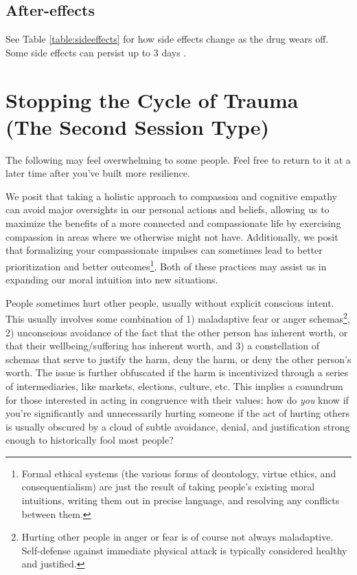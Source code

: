 \documentclass[12pt,letterpaper]{book}
\begin{document}
\subsection*{After-effects}
See Table \ref{table:sideeffects} for how side effects change as the drug wears off. Some side effects can persist up to 3 days \cite{liechtiGender}.
\section{Stopping the Cycle of Trauma (The Second Session Type)}
\label{stopcycle}
The following may feel overwhelming to some people. Feel free to return to it at a later time after you’ve built more resilience. 

We posit that taking a holistic approach to compassion and cognitive empathy can avoid major oversights in our personal actions and beliefs, allowing us to maximize the benefits of a more connected and compassionate life by exercising compassion in areas where we otherwise might not have. Additionally, we posit that formalizing your compassionate impulses can sometimes lead to better prioritization and better outcomes\footnote{Formal ethical systems (the various forms of deontology, virtue ethics, and consequentialism) are just the result of taking people's existing moral intuitions, writing them out in precise language, and resolving any conflicts between them.}. Both of these practices may assist us in expanding our moral intuition into new situations.

People sometimes hurt other people, usually without explicit conscious intent. This usually involves some combination of 1) maladaptive fear or anger schemas\footnote{Hurting other people in anger or fear is of course not always maladaptive. Self-defense against immediate physical attack is typically considered healthy and justified.}, 2) unconscious avoidance of the fact that the other person has inherent worth, or that their wellbeing/suffering has inherent worth, and 3) a constellation of schemas that serve to justify the harm, deny the harm, or deny the other person's worth. The issue is further obfuscated if the harm is incentivized through a series of intermediaries, like markets, elections, culture, etc. This implies a conundrum for those interested in acting in congruence with their values: how do \textit{you} know if you're significantly and unnecessarily hurting someone if the act of hurting others is usually obscured by a cloud of subtle avoidance, denial, and justification strong enough to historically fool most people?
\end{document}
